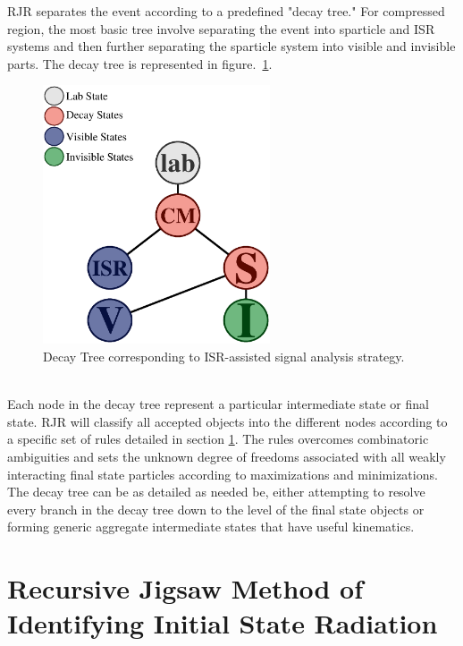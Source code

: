 \indent RJR separates the event according to a predefined "decay tree."  For compressed region, the most basic tree involve separating the event into sparticle and ISR systems and then further separating the sparticle system into visible and invisible parts. The decay tree is represented in figure.~\ref{fig:DecayTree}.
\begin{figure}[h]
\centering
\includegraphics[width=0.6\textwidth]{./figures/DecayTree.eps}
\caption{Decay Tree corresponding to ISR-assisted \MET signal analysis strategy. \label{fig:DecayTree}}
\end{figure}\\

Each node in the decay tree represent a particular intermediate state or final state.  RJR will classify all accepted objects into the different nodes according to a specific set of rules detailed in section \ref{Jigsaw:ISR}.  The rules overcomes combinatoric ambiguities and sets the unknown degree of freedoms associated with all weakly interacting final state particles according to maximizations and minimizations.   \\
The decay tree can be as detailed as needed be, either attempting to resolve every branch in the decay tree down to the level of the final state objects or forming generic aggregate intermediate states that have useful kinematics.   

\section{Recursive Jigsaw Method of Identifying Initial State Radiation}
\label{Jigsaw:ISR}

